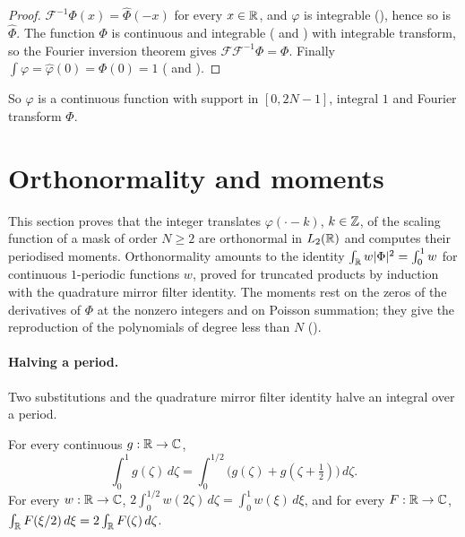 \begin{proof}
\leanok
{}
$\mathcal F^{-1} \Phi(x) = \widehat\Phi(-x)$ for every $x \in \mathbb{R}$, and $\varphi$ is integrable
(), hence so is $\widehat\Phi$. The function $\Phi$ is
continuous and integrable
( and ) with
integrable transform, so the Fourier inversion theorem gives
$\mathcal F \mathcal F^{-1} \Phi = \Phi$. Finally $\int \varphi = \widehat\varphi(0) = \Phi(0) = 1$
( and ).
\end{proof}

So $\varphi$ is a continuous function with support in $[0, 2N - 1]$, integral $1$ and Fourier
transform $\Phi$.

\section{Orthonormality and moments}

This section proves that the integer translates $\varphi(\cdot - k)$, $k \in \mathbb{Z}$, of the scaling
function of a mask of order $N \geq 2$ are orthonormal in $L_2(\mathbb{R})$ and computes their periodised
moments. Orthonormality amounts to the identity
$\int_{\mathbb{R}} w |\Phi|^2 = \int_0^1 w$ for continuous $1$-periodic functions $w$, proved for
truncated products by induction with the quadrature mirror filter identity. The moments rest on
the zeros of the derivatives of $\Phi$ at the nonzero integers and on Poisson summation; they give
the reproduction of the polynomials of degree less than $N$ ().

\paragraph{Halving a period.}
Two substitutions and the quadrature mirror filter identity halve an integral over a period.

\begin{lemma}[Substitutions]
\label{lem:daub-substitutions}
\leanok
For every continuous $g : \mathbb{R} \to \mathbb{C}$,
\[
  \int_0^1 g(\zeta) \, d\zeta
  = \int_0^{1/2} \bigl(g(\zeta) + g(\zeta + \tfrac12)\bigr) \, d\zeta .
\]
For every $w : \mathbb{R} \to \mathbb{C}$, $2 \int_0^{1/2} w(2\zeta) \, d\zeta = \int_0^1 w(\xi) \, d\xi$, and
for every $F : \mathbb{R} \to \mathbb{C}$, $\int_{\mathbb{R}} F(\xi/2) \, d\xi = 2 \int_{\mathbb{R}} F(\zeta) \, d\zeta$.
\end{lemma}

